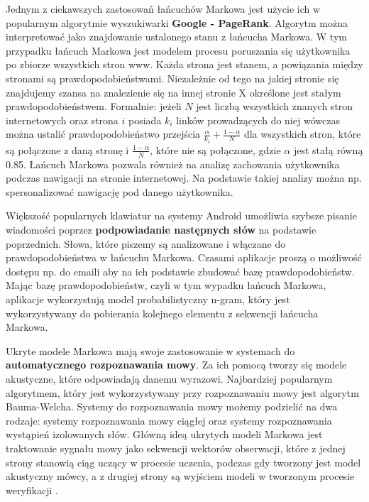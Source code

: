 	Jednym z ciekawszych zastosowań łańcuchów Markowa jest użycie ich w popularnym algorytmie wyszukiwarki \textbf{Google - PageRank}. Algorytm można interpretować jako znajdowanie ustalonego stanu z łańcucha Markowa. W tym przypadku łańcuch Markowa jest modelem procesu poruszania się użytkownika po zbiorze wszystkich stron www. Każda strona jest stanem, a powiązania między stronami są prawdopodobieństwami. Niezależnie od tego na jakiej stronie się znajdujemy szansa na znalezienie się na innej stronie X określone jest stałym prawdopodobieństwem. Formalnie: jeżeli $N$ jest liczbą wszystkich znanych stron internetowych oraz strona $i$ posiada $k_{i}$ linków prowadzących do niej wówczas można ustalić prawdopodobieństwo przejścia $\frac{\alpha}{k_{i}} + \frac{1-\alpha}{N}$ dla wszystkich stron, które są połączone z daną stronę i $\frac{1-\alpha}{N}$, które nie są połączone, gdzie $\alpha$ jest stałą równą 0.85. Łańcuch Markowa pozwala również na analizę zachowania użytkownika podczas nawigacji na stronie internetowej. Na podstawie takiej analizy można np. spersonalizować nawigację pod danego użytkownika. 
 
	Większość popularnych klawiatur na systemy Android umożliwia szybsze pisanie wiadomości poprzez \textbf{podpowiadanie następnych słów} na podstawie poprzednich. Słowa, które piszemy są analizowane i włączane do prawdopodobieństwa w łańcuchu Markowa. Czasami aplikacje proszą o możliwość dostępu np. do emaili aby na ich podstawie zbudować bazę prawdopodobieństw. Mając bazę prawdopodobieństw, czyli w tym wypadku łańcuch Markowa, aplikacje wykorzystują model probabilistyczny n-gram, który jest wykorzystywany do pobierania kolejnego elementu z sekwencji łańcucha Markowa. 
  	
	Ukryte modele Markowa mają swoje zastosowanie w systemach do \textbf{automatycznego rozpoznawania mowy}. Za ich pomocą tworzy się modele akustyczne, które odpowiadają danemu wyrazowi. Najbardziej popularnym algorytmem, który jest wykorzystywany przy rozpoznawaniu mowy jest algorytm Bauma-Welcha. Systemy do rozpoznawania mowy możemy podzielić na dwa rodzaje: systemy rozpoznawania mowy ciągłej oraz systemy rozpoznawania wystąpień izolowanych słów. Główną ideą ukrytych modeli Markowa jest traktowanie sygnału mowy jako sekwencji wektorów obserwacji, które z jednej strony stanowią ciąg uczący w procesie uczenia, podczas gdy tworzony jest model akustyczny mówcy, a z drugiej strony są wyjściem modeli w tworzonym procesie weryfikacji . 

